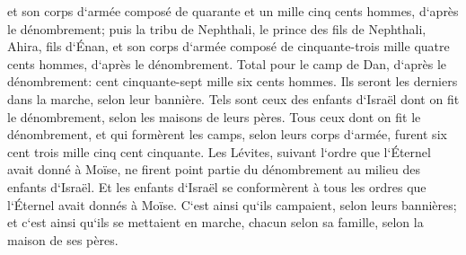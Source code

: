 \verse et son corps d`armée composé de quarante et un mille cinq cents hommes, d`après le dénombrement; 
\verse puis la tribu de Nephthali, le prince des fils de Nephthali, Ahira, fils d`Énan, 
\verse et son corps d`armée composé de cinquante-trois mille quatre cents hommes, d`après le dénombrement. 
\verse Total pour le camp de Dan, d`après le dénombrement: cent cinquante-sept mille six cents hommes. Ils seront les derniers dans la marche, selon leur bannière. 
\verse Tels sont ceux des enfants d`Israël dont on fit le dénombrement, selon les maisons de leurs pères. Tous ceux dont on fit le dénombrement, et qui formèrent les camps, selon leurs corps d`armée, furent six cent trois mille cinq cent cinquante. 
\verse Les Lévites, suivant l`ordre que l`Éternel avait donné à Moïse, ne firent point partie du dénombrement au milieu des enfants d`Israël. 
\verse Et les enfants d`Israël se conformèrent à tous les ordres que l`Éternel avait donnés à Moïse. C`est ainsi qu`ils campaient, selon leurs bannières; et c`est ainsi qu`ils se mettaient en marche, chacun selon sa famille, selon la maison de ses pères. 

\chapter{}

